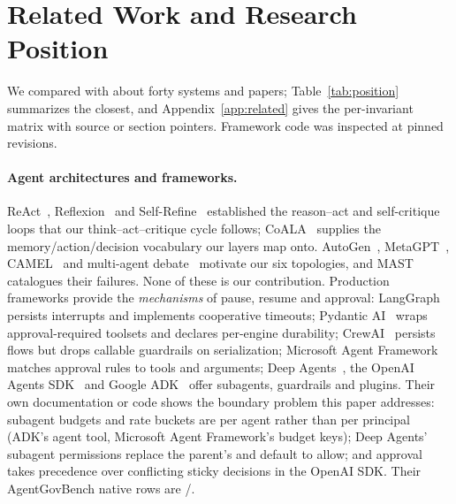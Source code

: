 \section{Related Work and Research Position}
\label{sec:related}
We compared \method{} with about forty systems and papers; Table~\ref{tab:position} summarizes the closest, and Appendix~\ref{app:related} gives the per-invariant matrix with source or section pointers. Framework code was inspected at pinned revisions.

\paragraph{Agent architectures and frameworks.} ReAct~\cite{yao2023react}, Reflexion~\cite{shinn2023reflexion} and Self-Refine~\cite{madaan2023selfrefine} established the reason--act and self-critique loops that our think--act--critique cycle follows; CoALA~\cite{sumers2024coala} supplies the memory/action/decision vocabulary our layers map onto. AutoGen~\cite{wu2024autogen}, MetaGPT~\cite{hong2024metagpt}, CAMEL~\cite{li2023camel} and multi-agent debate~\cite{du2024debate} motivate our six topologies, and MAST~\cite{cemri2025mast} catalogues their failures. None of these is our contribution. Production frameworks provide the \emph{mechanisms} of pause, resume and approval: LangGraph~\cite{langgraph} persists interrupts and implements cooperative timeouts; Pydantic AI~\cite{pydanticai} wraps approval-required toolsets and declares per-engine durability; CrewAI~\cite{crewai} persists flows but drops callable guardrails on serialization; Microsoft Agent Framework~\cite{msagentframework} matches approval rules to tools and arguments; Deep Agents~\cite{deepagents}, the OpenAI Agents SDK~\cite{openaiagentssdk} and Google ADK~\cite{googleadk} offer subagents, guardrails and plugins. Their own documentation or code shows the boundary problem this paper addresses: subagent budgets and rate buckets are per agent rather than per principal (ADK's agent tool, Microsoft Agent Framework's budget keys); Deep Agents' subagent permissions replace the parent's and default to allow; and approval takes precedence over conflicting sticky decisions in the OpenAI SDK. Their AgentGovBench native rows are \AGBNativeScore{}/\AGBTotal{}.

